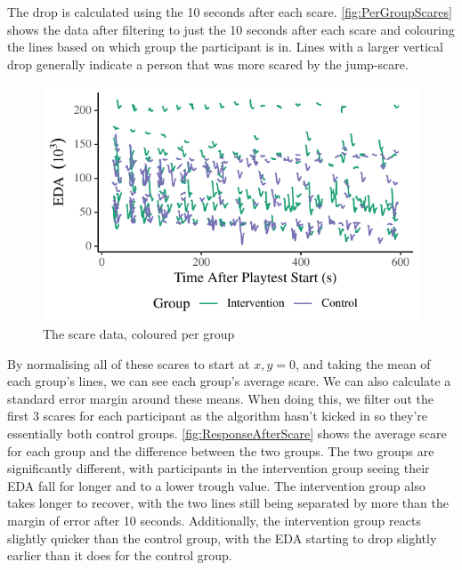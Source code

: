 \documentclass[12pt,a4paper]{article}\usepackage[]{graphicx}\usepackage[]{color}
\makeatletter
\def\maxwidth{ %
  \ifdim\Gin@nat@width>\linewidth
    \linewidth
  \else
    \Gin@nat@width
  \fi
}
\makeatother
\begin{document}
The drop is calculated using the 10 seconds after each scare.
\vref{fig:PerGroupScares} shows the data after filtering to just the 10 seconds after each scare and colouring the lines based on which group the participant is in.
Lines with a larger vertical drop generally indicate a person that was more scared by the jump-scare.

\begin{figure}[htb]


{\centering \includegraphics[width=\maxwidth]{figure/PerGroupScares-1} 

}



\caption{The scare data, coloured per group}
\label{fig:PerGroupScares}
\end{figure}

By normalising all of these scares to start at $x,y = 0$, and taking the mean of each group's lines, we can see each group's average scare.
We can also calculate a standard error margin around these means.
When doing this, we filter out the first 3 scares for each participant as the algorithm hasn't kicked in so they're essentially both control groups.
\vref{fig:ResponseAfterScare} shows the average scare for each group and the difference between the two groups.
The two groups are significantly different, with participants in the intervention group seeing their EDA fall for longer and to a lower trough value.
The intervention group also takes longer to recover, with the two lines still being separated by more than the margin of error after 10 seconds.
Additionally, the intervention group reacts slightly quicker than the control group, with the EDA starting to drop slightly earlier than it does for the control group.
\end{document}

